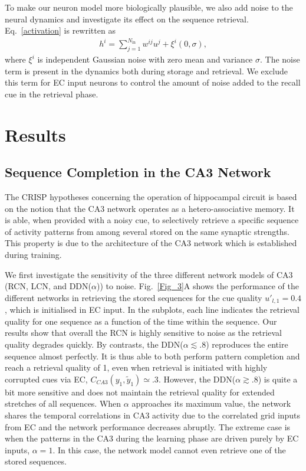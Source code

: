 \documentclass[utf8]{frontiersSCNS} %
\begin{document}
To make our neuron model more biologically plausible, we also add noise to the neural dynamics and investigate its effect on the sequence retrieval. Eq.~\ref{activation} is rewritten as
\begin{align}
\label{dynamic-noise}
h^i = \sum_{j=1}^{N_\mathrm{in}} w^{ij}u^j + \xi ^i (0,\sigma),
\end{align}  
where $\xi^i$ is independent Gaussian noise with zero mean and variance $\sigma$. The noise term is present in the dynamics both during storage and retrieval. We exclude this term for EC input neurons to control the amount of noise added to the recall cue in the retrieval phase.


\section{Results}
\subsection{Sequence Completion in the CA3 Network}

The CRISP hypotheses concerning the operation of hippocampal circuit is based on the notion that the CA3 network operates as a hetero-associative memory. It is able, when provided with a noisy cue, to selectively retrieve a specific sequence of activity patterns from among several stored on the same synaptic strengths. This property is due to the architecture of the CA3 network which is established during training. 

We first investigate the sensitivity of the three different network models of CA3 (RCN, LCN, and DDN($\alpha$)) to noise. Fig.~\ref{Fig_3}A shows the performance of the different networks in retrieving the stored sequences for the cue quality $u'_{l, 1} = 0.4$, which is initialised in EC input. In the subplots, each line indicates the retrieval quality for one sequence as a function of the time within the sequence. Our results show that overall the RCN is highly sensitive to noise as the retrieval quality degrades quickly.  
By contrasts, the DDN($\alpha \lesssim .8$) reproduces the entire sequence almost perfectly. It is thus able to both perform pattern completion and reach a retrieval quality of 1, even when retrieval is initiated with highly corrupted cues via EC, $C_{CA3} (y_1, \tilde{y}_1) \simeq .3 $. 
However, the DDN($\alpha \gtrsim .8$) is quite a bit more sensitive and does not maintain the retrieval quality for extended stretches of all sequences. When $\alpha$ approaches its maximum value, the network shares the temporal correlations in CA3 activity due to the correlated grid inputs from EC and the network performance decreases abruptly. The extreme case is when the patterns in the CA3 during the learning phase are driven purely by EC inputs, $\alpha = 1$. In this case, the network model cannot even retrieve one of the stored sequences.
% 
\end{document}
